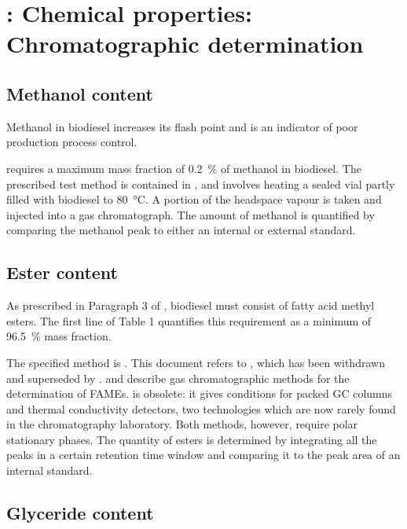 \section{: Chemical properties: Chromatographic determination}
\label{sec:ChromDet}

\subsection{Methanol content}

Methanol in biodiesel increases its flash point and is an indicator of poor
production process control.

 requires a maximum mass fraction of \SI{0.2}{\percent} of
methanol in biodiesel. The prescribed test method is contained in , and involves heating a sealed vial partly filled with biodiesel to
\SI{80}{\celsius}. A portion of the headspace vapour is taken and injected into
a gas chromatograph. The amount of methanol is quantified by comparing the
methanol peak to either an internal or external standard.

\subsection{Ester content}
\label{sec:EsterContent}
As prescribed in Paragraph 3 of , biodiesel must consist of fatty
acid methyl esters. The first line of Table 1 quantifies this requirement as a
minimum of \SI{96.5}{\percent} mass fraction.

The specified method is . This document refers to , which has been withdrawn and superseded by .
 and  describe gas chromatographic methods for the
determination of FAMEs.  is obsolete: it gives conditions for
packed GC columns and thermal conductivity detectors, two technologies which are
now rarely found in the chromatography laboratory. Both methods, however,
require polar stationary phases. The quantity of esters is determined by
integrating all the peaks in a certain retention time window and comparing it to
the peak area of an internal standard.

\subsection{Glyceride content}
\label{sec:Glycerides}

